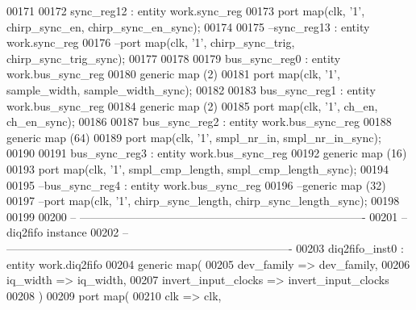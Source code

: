 \begin{DoxyCode}
00171 
00172 sync\_reg12 : \textcolor{keywordflow}{entity} work.sync_reg 
00173 \textcolor{keywordflow}{port} \textcolor{keywordflow}{map}(clk, '1', chirp_sync_en, chirp_sync_en_sync\textcolor{vhdlchar}{)};
00174 
00175 \textcolor{keyword}{--sync\_reg13 : entity work.sync\_reg }
00176 \textcolor{keyword}{--port map(clk, '1', chirp\_sync\_trig, chirp\_sync\_trig\_sync);}
00177 
00178 
00179 bus\_sync\_reg0 : \textcolor{keywordflow}{entity} work.bus_sync_reg
00180 \textcolor{keywordflow}{generic} \textcolor{keywordflow}{map} (\textcolor{vhdllogic}{2}\textcolor{vhdlchar}{)}
00181 \textcolor{keywordflow}{port} \textcolor{keywordflow}{map}(clk, '1', sample_width, sample_width_sync\textcolor{vhdlchar}{)};
00182 
00183 bus\_sync\_reg1 : \textcolor{keywordflow}{entity} work.bus_sync_reg
00184 \textcolor{keywordflow}{generic} \textcolor{keywordflow}{map} (\textcolor{vhdllogic}{2}\textcolor{vhdlchar}{)}
00185 \textcolor{keywordflow}{port} \textcolor{keywordflow}{map}(clk, '1', ch_en, ch_en_sync\textcolor{vhdlchar}{)};
00186 
00187 bus\_sync\_reg2 : \textcolor{keywordflow}{entity} work.bus_sync_reg
00188 \textcolor{keywordflow}{generic} \textcolor{keywordflow}{map} (\textcolor{vhdllogic}{64}\textcolor{vhdlchar}{)}
00189 \textcolor{keywordflow}{port} \textcolor{keywordflow}{map}(clk, '1', smpl_nr_in, smpl_nr_in_sync\textcolor{vhdlchar}{)};
00190 
00191 bus\_sync\_reg3 : \textcolor{keywordflow}{entity} work.bus_sync_reg
00192 \textcolor{keywordflow}{generic} \textcolor{keywordflow}{map} (\textcolor{vhdllogic}{16}\textcolor{vhdlchar}{)}
00193 \textcolor{keywordflow}{port} \textcolor{keywordflow}{map}(clk, '1', smpl_cmp_length, smpl_cmp_length_sync\textcolor{vhdlchar}{)};
00194 
00195 \textcolor{keyword}{--bus\_sync\_reg4 : entity work.bus\_sync\_reg}
00196 \textcolor{keyword}{--generic map (32)}
00197 \textcolor{keyword}{--port map(clk, '1', chirp\_sync\_length, chirp\_sync\_length\_sync);}
00198 
00199 
00200 \textcolor{keyword}{-- ----------------------------------------------------------------------------}
00201 \textcolor{keyword}{-- diq2fifo instance}
00202 \textcolor{keyword}{-- ----------------------------------------------------------------------------}
00203 diq2fifo\_inst0 : \textcolor{keywordflow}{entity} work.diq2fifo
00204    \textcolor{keywordflow}{generic} \textcolor{keywordflow}{map}( 
00205       dev_family           => dev_family,
00206       iq_width             => iq_width,
00207       invert_input_clocks  => invert_input_clocks
00208       \textcolor{vhdlchar}{)}
00209    \textcolor{keywordflow}{port} \textcolor{keywordflow}{map}(
00210       clk               => clk,

\end{DoxyCode}

